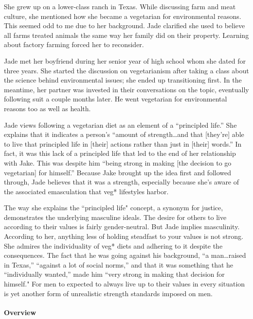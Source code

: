 \documentclass[twoside]{report}
\begin{document}
She grew up on a lower-class ranch in Texas. While discussing farm and meat culture, she mentioned how she became a vegetarian for environmental reasons. This seemed odd to me due to her background. Jade clarified she used to believe all farms treated animals the same way her family did on their property. Learning about factory farming forced her to reconsider.

Jade met her boyfriend during her senior year of high school whom she dated for three years. She started the discussion on vegetarianism after taking a class about the science behind environmental issues; she ended up transitioning first. In the meantime, her partner was invested in their conversations on the topic, eventually following suit a couple months later. He went vegetarian for environmental reasons too as well as health.

Jade views following a vegetarian diet as an element of a ``principled life.'' She explains that it indicates a person's ``amount of strength\ldots{}and that {[}they're{]} able to live that principled life in {[}their{]} actions rather than just in {[}their{]} words.'' In fact, it was this lack of a principled life that led to the end of her relationship with Jake. This was despite him ``being strong in making {[}the decision to go vegetarian{]} for himself.'' Because Jake brought up the idea first and followed through, Jade believes that it was a strength, especially because she's aware of the associated emasculation that veg* lifestyles harbor.

The way she explains the ``principled life" concept, a synonym for justice, demonstrates the underlying masculine ideals. The desire for others to live according to their values is fairly gender-neutral. But Jade implies masculinity. According to her, anything less of holding steadfast to your values is not strong. She admires the individuality of veg* diets and adhering to it despite the consequences. The fact that he was going against his background, ``a man\ldots{}raised in Texas,'' ``against a lot of social norms,'' and that it was something that he ``individually wanted,'' made him ``very strong in making that decision for himself." For men to expected to always live up to their values in every situation is yet another form of unrealistic strength standards imposed on men.

\paragraph{Overview}
\end{document}
